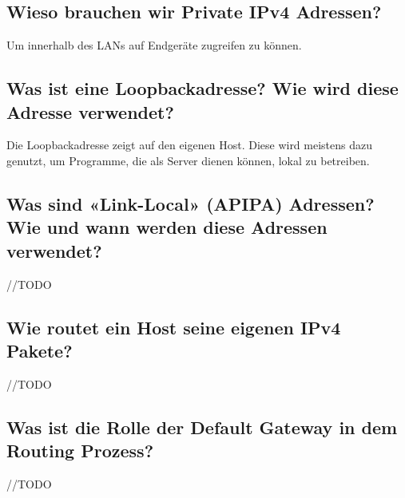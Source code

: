 \subsection*{Wieso brauchen wir Private IPv4 Adressen?}
Um innerhalb des LANs auf Endgeräte zugreifen zu können.
\subsection*{Was ist eine Loopbackadresse? Wie wird diese Adresse verwendet?}
Die Loopbackadresse zeigt auf den eigenen Host. Diese wird meistens dazu genutzt, um Programme, die als Server dienen können, lokal zu betreiben.
\subsection*{Was sind «Link-Local» (APIPA) Adressen? Wie und wann werden diese Adressen verwendet?}\label{sub:APIPA}
//TODO
\subsection*{Wie routet ein Host seine eigenen IPv4 Pakete?}
//TODO
\subsection*{Was ist die Rolle der Default Gateway in dem Routing Prozess?}
//TODO

